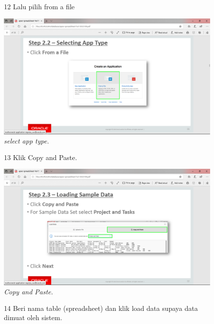 \begin{enumerate}
\begin{figure}
\item[12] Lalu pilih from a file

    \begin{center}
\includegraphics[scale=0.3]{figures/pic(5).png}
    \caption{\textit{select app type.}}
        \end{center}
\label{gambar}
\end{figure}

\begin{figure}
\item[13] Klik Copy and Paste.

    \begin{center}
\includegraphics[scale=0.3]{figures/pic(6).png}
    \caption{\textit{Copy and Paste.}}
        \end{center}
\label{gambar}
\end{figure}

\begin{figure}
\item[14] Beri nama table (spreadsheet) dan klik load data supaya data dimuat oleh sistem.


\end{figure}
\end{enumerate}
